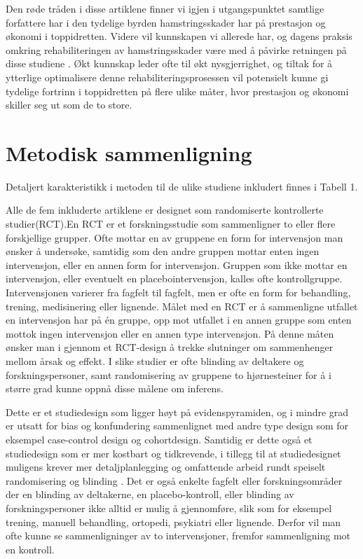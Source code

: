 \documentclass[
]{book}
\begin{document}
Den røde tråden i disse artiklene finner vi igjen i utgangspunktet samtlige forfattere har i den tydelige byrden hamstringsskader har på prestasjon og økonomi i toppidretten\citep{ekstrand2011, hickey2014, eirale2013}. Videre vil kunnskapen vi allerede har, og dagens praksis omkring rehabiliteringen av hamstringsskader være med å påvirke retningen på disse studiene \citep{brooks2006, horst2017, opar2012, podlog2014}. Økt kunnskap leder ofte til økt nysgjerrighet, og tiltak for å ytterlige optimalisere denne rehabiliteringsprosessen vil potensielt kunne gi tydelige fortrinn i toppidretten på flere ulike måter, hvor prestasjon og økonomi skiller seg ut som de to store.

\hypertarget{metodisk-sammenligning}{%
\section{Metodisk sammenligning}\label{metodisk-sammenligning}}

Detaljert karakteristikk i metoden til de ulike studiene inkludert finnes i Tabell 1.

Alle de fem inkluderte artiklene er designet som randomiserte kontrollerte studier(RCT)\citep{askling2014, askling2013, hickey2020, ahamid2014, hamilton2015}.En RCT er et forskningsstudie som sammenligner to eller flere forskjellige grupper\citep[s 137-139.]{hulley2013}. Ofte mottar en av gruppene en form for intervensjon man ønsker å undersøke, samtidig som den andre gruppen mottar enten ingen intervensjon, eller en annen form for intervensjon. Gruppen som ikke mottar en intervensjon, eller eventuelt en placebointervensjon, kalles ofte kontrollgruppe. Intervensjonen varierer fra fagfelt til fagfelt, men er ofte en form for behandling, trening, medisinering eller lignende. Målet med en RCT er å sammenligne utfallet en intervensjon har på én gruppe, opp mot utfallet i en annen gruppe som enten mottok ingen intervensjon eller en annen type intervensjon. På denne måten ønsker man i gjennom et RCT-design å trekke slutninger om sammenhenger mellom årsak og effekt\citep[s. 121]{hulley2013}. I slike studier er ofte blinding av deltakere og forskningspersoner, samt randomisering av gruppene to hjørnesteiner for å i større grad kunne oppnå disse målene om inferens\citep[s.138-140]{hulley2013}.

Dette er et studiedesign som ligger høyt på evidenspyramiden, og i mindre grad er utsatt for bias og konfundering sammenlignet med andre type design som for eksempel case-control design og cohortdesign\citep[s.109-110]{hulley2013}. Samtidig er dette også et studiedesign som er mer kostbart og tidkrevende, i tillegg til at studiedesignet muligens krever mer detaljplanlegging og omfattende arbeid rundt speiselt randomisering og blinding \citep[s.139-141]{hulley2013}. Det er også enkelte fagfelt eller forskningsområder der en blinding av deltakerne, en placebo-kontroll, eller blinding av forskningspersoner ikke alltid er mulig å gjennomføre, slik som for eksempel trening, manuell behandling, ortopedi, psykiatri eller lignende. Derfor vil man ofte kunne se sammenligninger av to intervensjoner, fremfor sammenligning mot en kontroll\citep[s.137-139]{hulley2013}.
\end{document}
